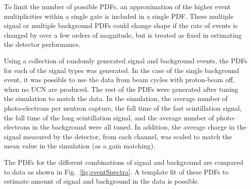 \documentclass[letter,twocolumn,preprint,3p,numbers,sort&compress]{elsarticle}
\begin{document}
To limit the number of possible PDFs, an approximation of the higher
event multiplicities within a single gate is included in a single PDF.
These multiple signal or multiple background PDFs could change shape
if the rate of events is changed by over a few orders of magnitude,
but is treated as fixed in estimating the detector performance.

Using a collection of randomly generated signal and background events,
the PDFs for each of the signal types was generated.  In the case of
the single background event, it was possible to use the data from beam
cycles with proton-beam off, when no UCN are produced.  The rest of
the PDFs were generated after tuning the simulation to match the data.
In the simulation, the average number of photo-electrons per neutron
capture, the fall time of the fast scintillation signal, the fall time
of the long scintillation signal, and the average number of
photo-electrons in the background were all tuned.  In addition, the
average charge in the signal measured by the detector, from each
channel, was scaled to match the mean value in the simulation (as a
gain matching).

The PDFs for the different combinations of signal and background are
compared to data as shown in Fig.~\ref{fig:eventSpectra}.  A template
fit of these PDFs to estimate amount of signal and background in the
data is possible.
\end{document}
